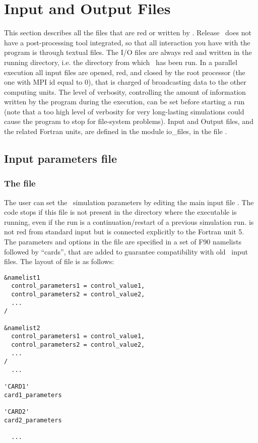\section{Input and Output Files}
\label{section:files}

This section describes all the files that are red or written by \PDAC.
Release \PDACVERSION\ does not have a post-processing tool integrated,
so that all interaction you have with the program is through textual files.
The I/O files are always red and written in the running directory,
i.e. the directory from which \PDAC\ has been run.
In a parallel execution all input files are opened, red, and closed
by the root processor (the one with MPI id equal to 0), that
is charged of broadcasting data to the other computing units.
The level of verbosity, controlling the amount of information written
by the program during the execution, can be set before starting a run
(note that a too high level of verbosity for very long-lasting 
simulations could cause the program to stop for file-system problems).
Input and Output files, and the related Fortran units, are defined in the 
module io\_files, in the file .

\subsection{Input parameters file}
\subsubsection{The  file}

The user can set the \PDAC\ simulation parameters
by editing the main input file .
The code stops if this file is not present in the 
directory where the executable is running, even if the run is a 
continuation/restart of a previous simulation run.
 is not red from standard 
input but is connected explicitly to the Fortran unit 5.\\

The parameters and options in the  file are specified
in a set of F90 namelists followed by ``cards'', that are added to
guarantee compatibility with old \PDAC\ input files. 
The layout of  file is as follows:

\begin{verbatim}
&namelist1
  control_parameters1 = control_value1,
  control_parameters2 = control_value2,
  ...
/

&namelist2
  control_parameters1 = control_value1,
  control_parameters2 = control_value2,
  ...
/
  ...

'CARD1'
card1_parameters

'CARD2'
card2_parameters

  ...

\end{verbatim}

